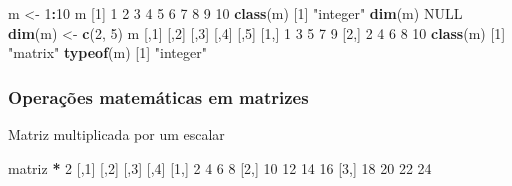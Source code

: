\documentclass[10pt,a4paper]{book}
\newenvironment{Shaded}{\begin{snugshade}}{\end{snugshade}}
\newcommand{\KeywordTok}[1]{\textcolor[rgb]{0.13,0.29,0.53}{\textbf{#1}}}
\newcommand{\DecValTok}[1]{\textcolor[rgb]{0.00,0.00,0.81}{#1}}
\newcommand{\StringTok}[1]{\textcolor[rgb]{0.31,0.60,0.02}{#1}}
\newcommand{\OtherTok}[1]{\textcolor[rgb]{0.56,0.35,0.01}{#1}}
\newcommand{\OperatorTok}[1]{\textcolor[rgb]{0.81,0.36,0.00}{\textbf{#1}}}
\newcommand{\NormalTok}[1]{#1}
\begin{document}
\begin{Shaded}
\begin{Highlighting}[]
\NormalTok{m <-}\StringTok{ }\DecValTok{1}\OperatorTok{:}\DecValTok{10}
\NormalTok{m}
\NormalTok{ [}\DecValTok{1}\NormalTok{]  }\DecValTok{1}  \DecValTok{2}  \DecValTok{3}  \DecValTok{4}  \DecValTok{5}  \DecValTok{6}  \DecValTok{7}  \DecValTok{8}  \DecValTok{9} \DecValTok{10}
\KeywordTok{class}\NormalTok{(m)}
\NormalTok{[}\DecValTok{1}\NormalTok{] }\StringTok{"integer"}
\KeywordTok{dim}\NormalTok{(m)}
\OtherTok{NULL}
\KeywordTok{dim}\NormalTok{(m) <-}\StringTok{ }\KeywordTok{c}\NormalTok{(}\DecValTok{2}\NormalTok{, }\DecValTok{5}\NormalTok{)}
\NormalTok{m}
\NormalTok{     [,}\DecValTok{1}\NormalTok{] [,}\DecValTok{2}\NormalTok{] [,}\DecValTok{3}\NormalTok{] [,}\DecValTok{4}\NormalTok{] [,}\DecValTok{5}\NormalTok{]}
\NormalTok{[}\DecValTok{1}\NormalTok{,]    }\DecValTok{1}    \DecValTok{3}    \DecValTok{5}    \DecValTok{7}    \DecValTok{9}
\NormalTok{[}\DecValTok{2}\NormalTok{,]    }\DecValTok{2}    \DecValTok{4}    \DecValTok{6}    \DecValTok{8}   \DecValTok{10}
\KeywordTok{class}\NormalTok{(m)}
\NormalTok{[}\DecValTok{1}\NormalTok{] }\StringTok{"matrix"}
\KeywordTok{typeof}\NormalTok{(m)}
\NormalTok{[}\DecValTok{1}\NormalTok{] }\StringTok{"integer"}
\end{Highlighting}
\end{Shaded}

\subsubsection{Operações matemáticas em
matrizes}\label{operauxe7uxf5es-matemuxe1ticas-em-matrizes}

Matriz multiplicada por um escalar

\begin{Shaded}
\begin{Highlighting}[]
\NormalTok{matriz }\OperatorTok{*}\StringTok{ }\DecValTok{2}
\NormalTok{     [,}\DecValTok{1}\NormalTok{] [,}\DecValTok{2}\NormalTok{] [,}\DecValTok{3}\NormalTok{] [,}\DecValTok{4}\NormalTok{]}
\NormalTok{[}\DecValTok{1}\NormalTok{,]    }\DecValTok{2}    \DecValTok{4}    \DecValTok{6}    \DecValTok{8}
\NormalTok{[}\DecValTok{2}\NormalTok{,]   }\DecValTok{10}   \DecValTok{12}   \DecValTok{14}   \DecValTok{16}
\NormalTok{[}\DecValTok{3}\NormalTok{,]   }\DecValTok{18}   \DecValTok{20}   \DecValTok{22}   \DecValTok{24}
\end{Highlighting}
\end{Shaded}
\end{document}

